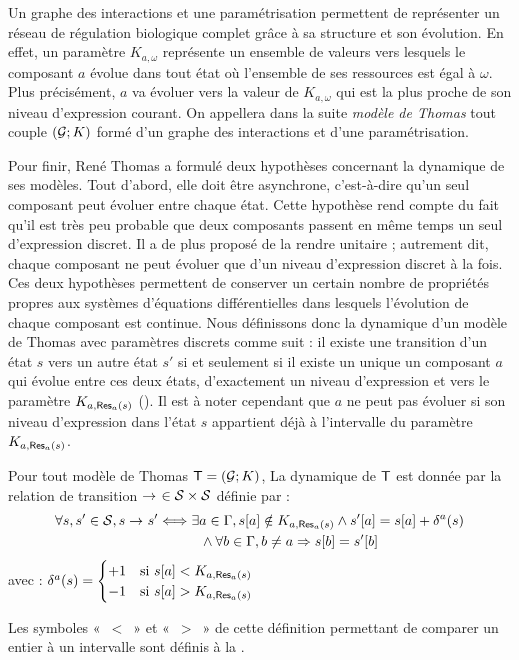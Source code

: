 Un graphe des interactions et une paramétrisation permettent de représenter
un réseau de régulation biologique complet grâce à sa structure et son évolution.
En effet, un paramètre $K_{a,\omega}$ représente un ensemble de valeurs vers lesquels
le composant $a$ évolue dans tout état où l'ensemble de ses ressources est égal à $\omega$.
Plus précisément, $a$ va évoluer vers la valeur de $K_{a,\omega}$ qui est la plus proche de
son niveau d'expression courant.
On appellera dans la suite \emph{modèle de Thomas} tout couple $(\mathcal{G}; K)$
formé d'un graphe des interactions et d'une paramétrisation.

Pour finir, René Thomas a formulé deux hypothèses concernant la dynamique de ses modèles.
Tout d'abord, elle doit être asynchrone, c'est-à-dire qu'un seul composant peut évoluer
entre chaque état.
Cette hypothèse rend compte du fait qu'il est très peu probable que deux composants passent
en même temps un seul d'expression discret.
Il a de plus proposé de la rendre unitaire ;
autrement dit, chaque composant ne peut évoluer que d'un niveau d'expression discret à la fois.
Ces deux hypothèses permettent de conserver un certain nombre de propriétés propres aux
systèmes d'équations différentielles dans lesquels l'évolution de chaque composant est continue.
Nous définissons donc la dynamique d'un modèle de Thomas avec paramètres discrets comme suit :
il existe une transition d'un état $s$ vers un autre état $s'$ si et seulement si
il existe un unique un composant $a$ qui évolue entre ces deux états,
d'exactement un niveau d'expression et vers le paramètre $K_{a,\mathsf{Res}_{a}(s)}$
().
Il est à noter cependant que $a$ ne peut pas évoluer si son niveau d'expression dans l'état $s$
appartient déjà à l'intervalle du paramètre $K_{a,\mathsf{Res}_{a}(s)}$.

\begin{definition}
  Pour tout modèle de Thomas $\mathsf{T} = (\mathcal{G}; K)$,
  La dynamique de $\mathsf{T}$ est donnée par la relation de transition
  $\rightarrow_{}\ \in \mathcal{S} \times \mathcal{S}$ définie par :
  \begin{align*}
    \forall s, s' \in \mathcal{S}, s \rightarrow_{} s'
      &\Longleftrightarrow \exists a \in \Gamma,
    {s[a]} \notin K_{a, \mathsf{Res}_{a}(s)} \wedge
      {s'[a]} = {s[a]} + \delta^a(s) \\
      &\qquad\quad \wedge \forall b \in \Gamma, b \neq a \Rightarrow {s[b]} = {s'[b]}
  \end{align*}
  avec : $\delta^a(s) = 
    \begin{cases}
      +1 & \text{si } {s[a]} < K_{a, \mathsf{Res}_{a}(s)} \\
      -1 & \text{si } {s[a]} > K_{a, \mathsf{Res}_{a}(s)} \\
    \end{cases}$
\end{definition}
Les symboles «~$<$~» et «~$>$~» de cette définition permettant de comparer un entier à
un intervalle sont définis à la .



